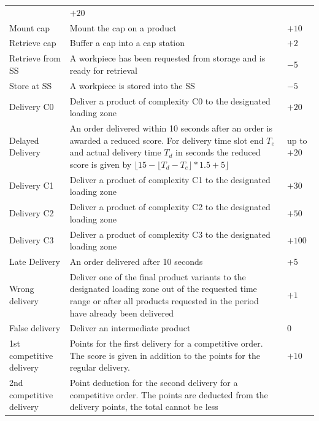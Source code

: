 \documentclass[12pt,twoside]{article}
\begin{document}
{\begin{longtable}{p{}
    |p{}
    |p{}}
        & $+20$
        \\
        Mount cap & Mount the cap on a product & $+10$
        \\
        Retrieve cap & Buffer a cap into a cap station & $+2$
        \\
        Retrieve from \ac{SS}
        & A workpiece has been requested from storage and is ready for retrieval
        & $-5$
        \\
        Store at \ac{SS}
        & A workpiece is stored into the \ac{SS}
        & $-5$
        \\
        Delivery C0
        & Deliver a product of complexity C0 to the designated loading
        zone
        & $+20$
        \\
        Delayed Delivery & An order delivered within 10 seconds after an order
        is awarded a reduced score. For delivery time slot end $T_e$ and actual
        delivery time $T_d$ in seconds the reduced score is given by \newline
        $\lfloor 15 - \lfloor T_d - T_e \rfloor * 1.5 + 5 \rfloor$
        & up to $+20$
        \\
        Delivery C1
        & Deliver a product of complexity C1 to the designated loading
        zone
        & $+30$
        \\
        Delivery C2
        & Deliver a product of complexity C2 to the designated loading
        zone
        & $+50$
        \\
        Delivery C3
        & Deliver a product of complexity C3 to the designated loading
        zone
        & $+100$
        \\
        Late Delivery & An order delivered after 10 seconds & +5 \\
        Wrong delivery & Deliver one of the final product variants to
        the designated loading zone out of the requested time range or
        after all products requested in the period have already been
        delivered
        & $+1$
        \\
        False delivery & Deliver an intermediate product & $0$
        \\
        1st competitive delivery
        & Points for the first delivery for a competitive order. The score is
        given in addition to the points for the regular delivery.
        &$+ 10$
        \\
        2nd competitive delivery
        & Point deduction for the second delivery for a competitive order. The
        points are deducted from the delivery points, the total cannot be less

\end{longtable}}
\end{document}
